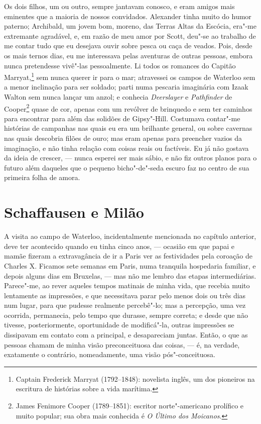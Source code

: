 Os dois filhos, um ou outro, sempre jantavam conosco, e eram amigos mais
eminentes que a maioria de nossos convidados. Alexander tinha muito do
humor paterno; Archibald, um jovem bom, moreno, das Terras Altas da
Escócia, era"-me extremante agradável, e, em razão de meu amor por Scott,
deu"-se ao trabalho de me contar tudo que eu desejava ouvir sobre pesca
ou caça de veados. Pois, desde os mais ternos dias, eu me interessava
pelas aventuras de outras pessoas, embora nunca pretendesse vivê"-las
pessoalmente. Li todos os romances do Capitão Marryat,\footnote{Captain
  Frederick Marryat (1792--1848): novelista inglês, um dos pioneiros na
  escritura de histórias sobre a vida marítima.} sem
nunca querer ir para o mar; atravessei os campos de Waterloo sem a menor
inclinação para ser soldado; parti numa pescaria imaginária com Izaak
Walton sem nunca lançar um anzol; e conhecia \textit{Deerslayer} e
\textit{Pathfinder} de Cooper\footnote{James Fenimore Cooper (1789--1851):
  escritor norte"-americano prolífico e muito popular; sua obra mais
  conhecida é \textit{O Último dos Moicanos}.} quase de
cor, apenas com um revólver de brinquedo e sem ter caminhos para
encontrar para além das solidões de Gipsy"-Hill. Costumava contar"-me
histórias de campanhas nas quais eu era um brilhante general, ou sobre
cavernas nas quais descobria filões de ouro; mas eram apenas para
preencher vazios da imaginação, e não tinha relação com coisas reais ou
factíveis. Eu já não gostava da ideia de crescer, --- nunca esperei ser
mais sábio, e não fiz outros planos para o futuro além daqueles que o
pequeno bicho"-de"-seda escuro faz no centro de sua primeira folha de
amora.

\chapter{Schaffausen e Milão} %

A visita ao campo de Waterloo, incidentalmente mencionada no
capítulo anterior, deve ter acontecido quando eu tinha cinco anos, ---
ocasião em que papai e mamãe fizeram a extravagância de ir a Paris ver
as festividades pela coroação de Charles X. Ficamos sete semanas em
Paris, numa tranquila hospedaria familiar, e depois alguns dias em
Bruxelas, --- mas não me lembro das etapas intermediárias. Parece"-me, ao
rever aqueles tempos matinais de minha vida, que recebia muito
lentamente as impressões, e que necessitava parar pelo menos dois ou
três dias num lugar, para que pudesse realmente percebê"-lo; mas a
percepção, uma vez ocorrida, permanecia, pelo tempo que durasse, sempre
correta; e desde que não tivesse, posteriormente, oportunidade de
modificá"-la, outras impressões se dissipavam em contato com a principal,
e desapareciam juntas. Então, o que as pessoas chamam de minha visão
preconceituosa das coisas, --- é, na verdade, exatamente o contrário,
nomeadamente, uma visão pós"-conceituosa.

